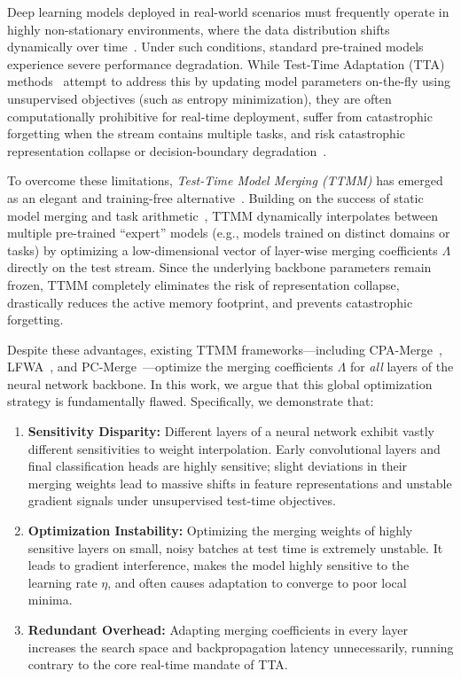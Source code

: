 \documentclass{article}
\theoremstyle{plain}
\theoremstyle{definition}
\theoremstyle{remark}
\begin{document}
Deep learning models deployed in real-world scenarios must frequently operate in highly non-stationary environments, where the data distribution shifts dynamically over time~\cite{liang2020we, wang2021tent}. Under such conditions, standard pre-trained models experience severe performance degradation. While Test-Time Adaptation (TTA) methods~\cite{wang2021tent, wang2022continual} attempt to address this by updating model parameters on-the-fly using unsupervised objectives (such as entropy minimization), they are often computationally prohibitive for real-time deployment, suffer from catastrophic forgetting when the stream contains multiple tasks, and risk catastrophic representation collapse or decision-boundary degradation~\cite{cpa_merge_anon2026, pc_merge_anon2026}.

To overcome these limitations, \textit{Test-Time Model Merging (TTMM)} has emerged as an elegant and training-free alternative~\cite{yang2024adamerging, cpa_merge_anon2026, lfwa_anon2026, pc_merge_anon2026}. Building on the success of static model merging and task arithmetic~\cite{ilharco2023task, yadav2023ties, yu2023dare}, TTMM dynamically interpolates between multiple pre-trained ``expert'' models (e.g., models trained on distinct domains or tasks) by optimizing a low-dimensional vector of layer-wise merging coefficients $\Lambda$ directly on the test stream. Since the underlying backbone parameters remain frozen, TTMM completely eliminates the risk of representation collapse, drastically reduces the active memory footprint, and prevents catastrophic forgetting.

Despite these advantages, existing TTMM frameworks—including CPA-Merge~\cite{cpa_merge_anon2026}, LFWA~\cite{lfwa_anon2026}, and PC-Merge~\cite{pc_merge_anon2026}—optimize the merging coefficients $\Lambda$ for \textit{all} layers of the neural network backbone. In this work, we argue that this global optimization strategy is fundamentally flawed. Specifically, we demonstrate that:
\begin{enumerate}
    \item \textbf{Sensitivity Disparity:} Different layers of a neural network exhibit vastly different sensitivities to weight interpolation. Early convolutional layers and final classification heads are highly sensitive; slight deviations in their merging weights lead to massive shifts in feature representations and unstable gradient signals under unsupervised test-time objectives.
    \item \textbf{Optimization Instability:} Optimizing the merging weights of highly sensitive layers on small, noisy batches at test time is extremely unstable. It leads to gradient interference, makes the model highly sensitive to the learning rate $\eta$, and often causes adaptation to converge to poor local minima.
    \item \textbf{Redundant Overhead:} Adapting merging coefficients in every layer increases the search space and backpropagation latency unnecessarily, running contrary to the core real-time mandate of TTA.
\end{enumerate}
\end{document}
